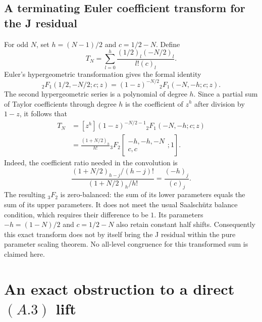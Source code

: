 \documentclass[11pt,letterpaper]{article}
\numberwithin{equation}{section}
\begin{document}
\subsection{A terminating Euler coefficient transform for the J residual}
For odd $N$, set $h=(N-1)/2$ and $c=1/2-N$. Define
\[
 T_N=\sum_{l=0}^{h}\frac{(1/2)_l(-N/2)_l}{l!(c)_l}.
\]
Euler's hypergeometric transformation gives the formal identity
\[
 {}_2F_1(1/2,-N/2;c;z)
 =(1-z)^{-N/2}{}_2F_1(-N,-h;c;z).
\]
The second hypergeometric series is a polynomial of degree $h$.
Since a partial sum of Taylor coefficients through degree $h$ is the
coefficient of $z^h$ after division by $1-z$, it follows that
\begin{align*}
 T_N
 &=[z^h](1-z)^{-N/2-1}{}_2F_1(-N,-h;c;z)\\
 &=\frac{(1+N/2)_h}{h!}
 {}_3F_2\!\left[\begin{matrix}-h,-h,-N\\c,c\end{matrix};1\right].
\end{align*}
Indeed, the coefficient ratio needed in the convolution is
\[
 \frac{(1+N/2)_{h-j}/(h-j)!}{(1+N/2)_h/h!}
 =\frac{(-h)_j}{(c)_j}.
\]
The resulting ${}_3F_2$ is zero-balanced: the sum of its lower
parameters equals the sum of its upper parameters. It does not meet
the usual Saalsch\"utz balance condition, which requires their
difference to be $1$. Its parameters $-h=(1-N)/2$ and $c=1/2-N$
also retain constant half shifts. Consequently this exact transform
does not by itself bring the J residual within the pure parameter
scaling theorem. No all-level congruence for this transformed sum is
claimed here.
\section{An exact obstruction to a direct \texorpdfstring{$(A.3)$}{(A.3)} lift}\label{loc-II-8}
\label{II-sec:a-obstruction}
\end{document}
